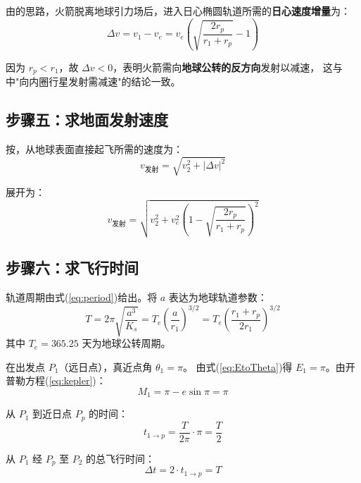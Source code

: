 \documentclass[12pt,a4paper]{ctexart}
\begin{document}
由\cite[\S6.2, 式(6.8)]{qian2008}的思路，火箭脱离地球引力场后，进入日心椭圆轨道所需的\textbf{日心速度增量}为：
\begin{equation}\label{eq:deltaV}
    \Delta v = v_1 - v_e = v_e\left(\sqrt{\frac{2r_p}{r_1 + r_p}} - 1\right)
\end{equation}

因为 $r_p < r_1$，故 $\Delta v < 0$，表明火箭需向\textbf{地球公转的反方向}发射以减速，
这与\cite[\S6.2, pp.~121]{qian2008}中"向内圈行星发射需减速"的结论一致。

\subsection{步骤五：求地面发射速度}

按\cite[\S6.3, 第一方案, pp.~122]{qian2008}，从地球表面直接起飞所需的速度为：
\begin{equation}\label{eq:v_launch}
    v_{\text{发射}} = \sqrt{v_2^2 + |\Delta v|^2}
\end{equation}

展开为：
\begin{equation}
    v_{\text{发射}} = \sqrt{v_2^2 + v_e^2\left(1 - \sqrt{\frac{2r_p}{r_1 + r_p}}\right)^2}
\end{equation}

\subsection{步骤六：求飞行时间}

轨道周期由式(\ref{eq:period})给出。将 $a$ 表达为地球轨道参数：
\begin{equation}\label{eq:T}
    T = 2\pi\sqrt{\frac{a^3}{K_s}} = T_e\left(\frac{a}{r_1}\right)^{3/2}
      = T_e\left(\frac{r_1 + r_p}{2r_1}\right)^{3/2}
\end{equation}
其中 $T_e = 365.25$ 天为地球公转周期。

在出发点 $P_1$（远日点），真近点角 $\theta_1 = \pi$。
由式(\ref{eq:EtoTheta})得 $E_1 = \pi$。由开普勒方程(\ref{eq:kepler})：
\begin{equation}
    M_1 = \pi - e\sin\pi = \pi
\end{equation}

从 $P_1$ 到近日点 $P_p$ 的时间：
\begin{equation}
    t_{1\to p} = \frac{T}{2\pi} \cdot \pi = \frac{T}{2}
\end{equation}

从 $P_1$ 经 $P_p$ 至 $P_2$ 的总飞行时间：
\begin{equation}\label{eq:dt}
    \Delta t = 2 \cdot t_{1\to p} = T
\end{equation}
\end{document}

